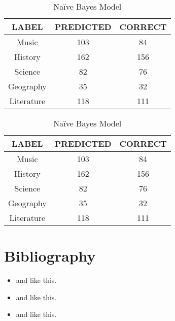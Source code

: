\documentclass[11pt]{article}
\begin{document}
\begin{table}[!htb]
    \begin{minipage}{.5\linewidth}
      \centering
        \begin{tabular}{c|c|c}
           LABEL & PREDICTED & CORRECT\\\hline
Music & 103 & 84\\
History & 162 & 156\\
Science & 82 & 76\\
Geography & 35 & 32\\
Literature & 118 & 111\\\hline
        \end{tabular}
        \caption{SVM + TF-IDF Model}
    \end{minipage}%
    \begin{minipage}{.5\linewidth}
      \centering
        \begin{tabular}{c|c|c}
                LABEL & PREDICTED & CORRECT\\\hline
 Music & 103 & 84\\
History & 162 & 156\\
Science & 82 & 76\\
Geography & 35 & 32\\
Literature & 118 & 111\\\hline
        \end{tabular}
        \caption{Naïve Bayes Model}
    \end{minipage} 
\end{table}

\section{Bibliography}
\begin{itemize}
\item and like this.
\item and like this.
\item and like this.
\end{itemize}
\end{document}

